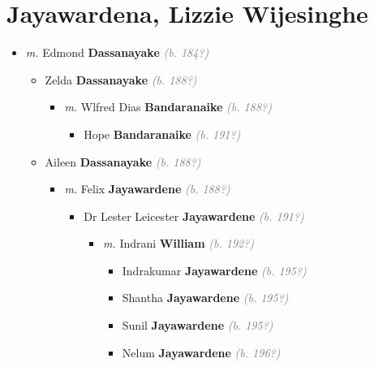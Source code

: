 \documentclass[10pt, openany]{book}
\begin{document}
\chapter{Jayawardena, Lizzie Wijesinghe}
\label{00003041}
\textcolor{slmaroon}{\textit{}}
\begin{itemize}
\item{\textit{m.} Edmond \textbf{Dassanayake} \textcolor{gray}{\textit{(b. 184?)}}   \label{couple:00003041:00003042} \begin{itemize}
\item{Zelda \textbf{Dassanayake} \textcolor{gray}{\textit{(b. 188?)}}
\begin{itemize}
\item{\textit{m.} Wlfred Dias \textbf{Bandaranaike} \textcolor{gray}{\textit{(b. 188?)}}   \label{couple:00003043:00003044} \begin{itemize}
\item{Hope \textbf{Bandaranaike} \textcolor{gray}{\textit{(b. 191?)}}
 }
\end{itemize}}
\end{itemize}
 }
\item{Aileen \textbf{Dassanayake} \textcolor{gray}{\textit{(b. 188?)}}
\begin{itemize}
\item{\textit{m.} Felix \textbf{Jayawardene} \textcolor{gray}{\textit{(b. 188?)}}   \label{couple:00003048:00003049} \begin{itemize}
\item{Dr Lester Leicester \textbf{Jayawardene} \textcolor{gray}{\textit{(b. 191?)}}
\begin{itemize}
\item{\textit{m.} Indrani \textbf{William} \textcolor{gray}{\textit{(b. 192?)}}   \label{couple:00003058:00003059} \begin{itemize}
\item{Indrakumar \textbf{Jayawardene} \textcolor{gray}{\textit{(b. 195?)}}
 }
\item{Shantha \textbf{Jayawardene} \textcolor{gray}{\textit{(b. 195?)}}
 }
\item{Sunil \textbf{Jayawardene} \textcolor{gray}{\textit{(b. 195?)}}
 }
\item{Nelum \textbf{Jayawardene} \textcolor{gray}{\textit{(b. 196?)}}
 }
\end{itemize}}

\end{itemize}}
\end{itemize}}
\end{itemize}}
\end{itemize}}
\end{itemize}
\end{document}
